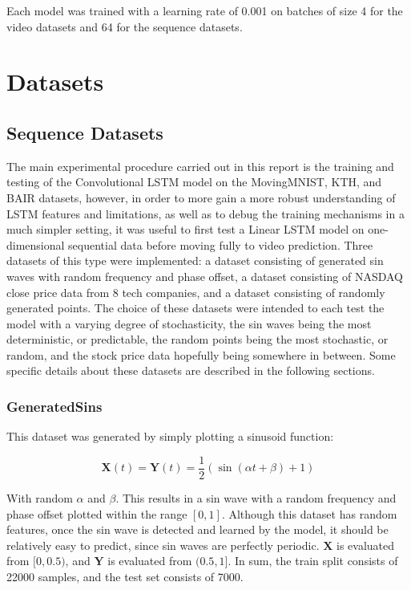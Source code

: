 \documentclass{scrartcl}
\begin{document}
Each model was trained with a learning rate of 0.001 on batches of size 4 for
the video datasets and 64 for the sequence datasets.

\section{Datasets}
\label{sec:datasets}

\subsection{Sequence Datasets}
\label{subsec:sequence_datasets}

The main experimental procedure carried out in this report is the training and
testing of the Convolutional LSTM model on the MovingMNIST, KTH, and BAIR
datasets, however, in order to more gain a more robust understanding of LSTM
features and limitations, as well as to debug the training mechanisms in a much
simpler setting, it was useful to first test a Linear LSTM model on
one-dimensional sequential data before moving fully to video prediction. Three
datasets of this type were implemented: a dataset consisting of generated sin
waves with random frequency and phase offset, a dataset consisting of NASDAQ
close price data from 8 tech companies, and a dataset consisting of randomly
generated points. The choice of these datasets were intended to each test the
model with a varying degree of stochasticity, the sin waves being the most
deterministic, or predictable, the random points being the most stochastic, or
random, and the stock price data hopefully being somewhere in between. Some
specific details about these datasets are described in the following sections.

\subsubsection{GeneratedSins}
\label{subsubsec:generatedsins_dataset}

This dataset was generated by simply plotting a sinusoid function:

\begin{equation}
	\boldsymbol{X} (t) = \boldsymbol{Y} (t) = \frac{1}{2} ( \sin (\alpha t + \beta) + 1)
	\label{eq:generated_sins}
\end{equation}

With random $\alpha$ and $\beta$. This results in a sin wave with a random
frequency and phase offset plotted within the range $[0, 1]$. Although this
dataset has random features, once the sin wave is detected and learned by the
model, it should be relatively easy to predict, since sin waves are perfectly
periodic. $\boldsymbol{X}$ is evaluated from $[0, 0.5)$, and $\boldsymbol{Y}$
is evaluated from $(0.5, 1]$. In sum, the train split consists of 22000
samples, and the test set consists of 7000. 
\end{document}
